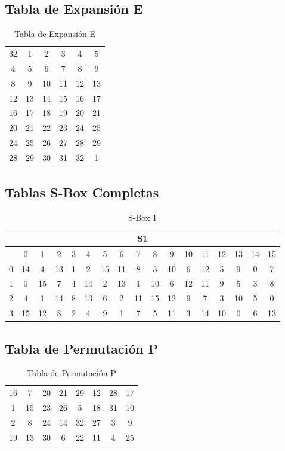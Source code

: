 \documentclass[12pt,a4paper]{article}
\begin{document}
\begin{appendix}
	\subsection{Tabla de Expansión E}
	\begin{table}[ht]
		\centering
		\caption{Tabla de Expansión E}
		\begin{tabular}{|c|c|c|c|c|c|}
			\hline
			32 & 1  & 2  & 3  & 4  & 5  \\
			4  & 5  & 6  & 7  & 8  & 9  \\
			8  & 9  & 10 & 11 & 12 & 13 \\
			12 & 13 & 14 & 15 & 16 & 17 \\
			16 & 17 & 18 & 19 & 20 & 21 \\
			20 & 21 & 22 & 23 & 24 & 25 \\
			24 & 25 & 26 & 27 & 28 & 29 \\
			28 & 29 & 30 & 31 & 32 & 1  \\
			\hline
		\end{tabular}
	\end{table}

	\subsection{Tablas S-Box Completas}
	\begin{table}[ht]
		\centering
		\caption{S-Box 1}
		\begin{tabular}{|c|c|c|c|c|c|c|c|c|c|c|c|c|c|c|c|c|}
			\hline
			\multicolumn{17}{|c|}{S1}                                                        \\
			\hline
			  & 0  & 1  & 2  & 3 & 4  & 5  & 6  & 7  & 8  & 9  & 10 & 11 & 12 & 13 & 14 & 15 \\
			\hline
			0 & 14 & 4  & 13 & 1 & 2  & 15 & 11 & 8  & 3  & 10 & 6  & 12 & 5  & 9  & 0  & 7  \\
			1 & 0  & 15 & 7  & 4 & 14 & 2  & 13 & 1  & 10 & 6  & 12 & 11 & 9  & 5  & 3  & 8  \\
			2 & 4  & 1  & 14 & 8 & 13 & 6  & 2  & 11 & 15 & 12 & 9  & 7  & 3  & 10 & 5  & 0  \\
			3 & 15 & 12 & 8  & 2 & 4  & 9  & 1  & 7  & 5  & 11 & 3  & 14 & 10 & 0  & 6  & 13 \\
			\hline
		\end{tabular}
	\end{table}

	\subsection{Tabla de Permutación P}
	\begin{table}[ht]
		\centering
		\caption{Tabla de Permutación P}
		\begin{tabular}{|c|c|c|c|c|c|c|c|}
			\hline
			16 & 7  & 20 & 21 & 29 & 12 & 28 & 17 \\
			1  & 15 & 23 & 26 & 5  & 18 & 31 & 10 \\
			2  & 8  & 24 & 14 & 32 & 27 & 3  & 9  \\
			19 & 13 & 30 & 6  & 22 & 11 & 4  & 25 \\
			\hline
		\end{tabular}
	\end{table}

\end{appendix}
\end{document}
